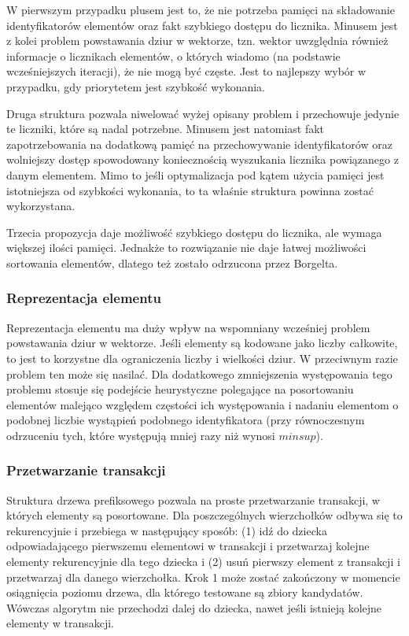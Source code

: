 W pierwszym przypadku plusem jest to, że nie potrzeba pamięci na składowanie identyfikatorów elementów oraz fakt szybkiego dostępu do licznika. Minusem jest z kolei problem powstawania dziur w wektorze, tzn. wektor uwzględnia również informacje o licznikach elementów, o których wiadomo (na podstawie wcześniejszych iteracji), że nie mogą być częste. Jest to najlepszy wybór w przypadku, gdy priorytetem jest szybkość wykonania.

Druga struktura pozwala niwelować wyżej opisany problem i przechowuje jedynie te liczniki, które są nadal potrzebne. Minusem jest natomiast fakt zapotrzebowania na dodatkową pamięć na przechowywanie identyfikatorów oraz wolniejszy dostęp spowodowany koniecznością wyszukania licznika powiązanego z danym elementem. Mimo to jeśli optymalizacja pod kątem użycia pamięci jest istotniejsza od szybkości wykonania, to ta właśnie struktura powinna zostać wykorzystana.

Trzecia propozycja daje możliwość szybkiego dostępu do licznika, ale wymaga większej ilości pamięci. Jednakże to rozwiązanie nie daje łatwej możliwości sortowania elementów, dlatego też zostało odrzucona przez Borgelta.

\subsubsection*{Reprezentacja elementu}
Reprezentacja elementu ma duży wpływ na wspomniany wcześniej problem powstawania dziur w wektorze. Jeśli elementy są kodowane jako liczby całkowite, to jest to korzystne dla ograniczenia liczby i wielkości dziur. W przeciwnym razie problem ten może się nasilać. Dla dodatkowego zmniejszenia występowania tego problemu stosuje się podejście heurystyczne polegające na posortowaniu elementów malejąco względem częstości ich występowania i nadaniu elementom o podobnej liczbie wystąpień podobnego identyfikatora (przy równoczesnym odrzuceniu tych, które występują mniej razy niż wynosi \(minsup\)). 

\subsubsection*{Przetwarzanie transakcji}
Struktura drzewa prefiksowego pozwala na proste przetwarzanie transakcji, w których elementy są posortowane. Dla poszczególnych wierzchołków odbywa się to rekurencyjnie i przebiega w następujący sposób: (1) idź do dziecka odpowiadającego pierwszemu elementowi w transakcji i przetwarzaj kolejne elementy rekurencyjnie dla tego dziecka i (2) usuń pierwszy element z transakcji i przetwarzaj dla danego wierzchołka. Krok 1 może zostać zakończony w momencie osiągnięcia poziomu drzewa, dla którego testowane są zbiory kandydatów. Wówczas algorytm nie przechodzi dalej do dziecka, nawet jeśli istnieją kolejne elementy w transakcji. 

